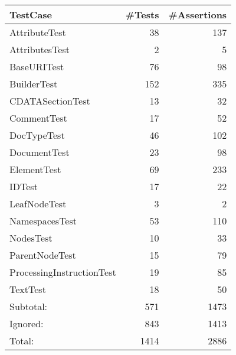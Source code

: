 \begin{tabular}{|l|r|r|}\hline
TestCase & \#Tests & \#Assertions\\\hline\hline
AttributeTest & 38 & 137\\\hline
AttributesTest & 2 & 5\\\hline
BaseURITest & 76 & 98\\\hline
BuilderTest & 152 & 335\\\hline
CDATASectionTest & 13 & 32\\\hline
CommentTest & 17 & 52\\\hline
DocTypeTest & 46 & 102\\\hline
DocumentTest & 23 & 98\\\hline
ElementTest & 69 & 233\\\hline
IDTest & 17 & 22\\\hline
LeafNodeTest & 3 & 2\\\hline
NamespacesTest & 53 & 110\\\hline
NodesTest & 10 & 33\\\hline
ParentNodeTest & 15 & 79\\\hline
ProcessingInstructionTest & 19 & 85\\\hline
TextTest & 18 & 50\\\hline
\hline
Subtotal: & 571 & 1473\\\hline
Ignored: & 843 & 1413\\\hline
Total: & 1414 & 2886\\\hline
\end{tabular}

